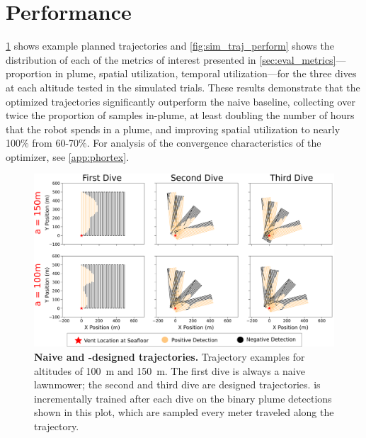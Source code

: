 \section{\PHORTEX Performance}
\label{sec:phortex_perform}
\cref{fig:sim_traj_example} shows example planned trajectories and \cref{fig:sim_traj_perform} shows the distribution of each of the metrics of interest presented in \cref{sec:eval_metrics}---proportion in plume, spatial utilization, temporal utilization---for the three dives at each altitude tested in the simulated trials. These results demonstrate that the \PHORTEX optimized trajectories significantly outperform the naive baseline, collecting over twice the proportion of samples in-plume, at least doubling the number of hours that the robot spends in a plume, and improving spatial utilization to nearly 100\% from 60-70\%. For analysis of the convergence characteristics of the optimizer, see \cref{app:phortex}. 

\begin{figure}[h!]
    \centering
    \includegraphics[width=0.85\columnwidth]{figures/sim_traj.png}
    \caption{\textbf{Naive and \PHORTEX-designed trajectories.} Trajectory examples for altitudes of \SI{100}{\meter} and \SI{150}{\meter}. The first dive is always a naive lawnmower; the second and third dive are \PHORTEX designed trajectories. \PHUMES is incrementally trained after each dive on the binary plume detections shown in this plot, which are sampled every meter traveled along the trajectory.}
    \label{fig:sim_traj_example}
\end{figure}


